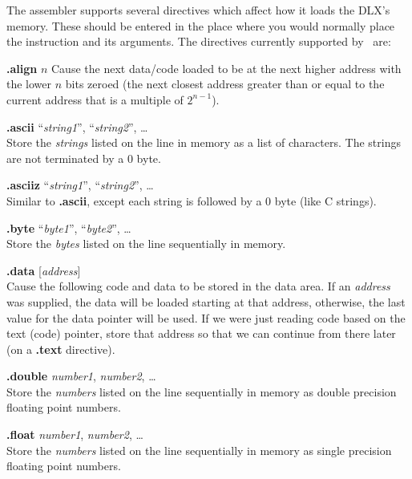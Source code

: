 \begin{mylist}
The assembler supports several directives which affect how it loads
the DLX's memory.  These should be entered in the place where you
would normally place the instruction and its arguments.  The
directives currently supported by \dlxsim\ are:

\begin{mylist}
\item[{\bf .align} $n$ \hfill]
Cause the next data/code loaded to be at the next higher address with
the lower $n$ bits zeroed (the next closest address greater than or
equal to the current address that is a multiple of $2^{n-1}$).

\item[{\bf .ascii} ``{\em string1}'', ``{\em string2}'', \ldots]
\nopagebreak \hfill \\
Store the {\em strings} listed on the line in memory as a list of
characters.  The strings are not terminated by a 0 byte.

\item[{\bf .asciiz} ``{\em string1}'', ``{\em string2}'', \ldots]
\nopagebreak \hfill \\
Similar to {\bf .ascii}, except each string is followed by a 0 byte
(like C strings).

\item[{\bf .byte} ``{\em byte1}'', ``{\em byte2}'', \ldots]
\nopagebreak \hfill \\
Store the {\em bytes} listed on the line sequentially in memory.

\item[{\bf .data} {[}{\em address}{]}]
\nopagebreak \hfill \\
Cause the following code and data to be stored in the data area.  If
an {\em address} was supplied, the data will be loaded starting at
that address, otherwise, the last value for the data pointer will be
used.  If we were just reading code based on the text (code) pointer,
store that address so that we can continue from there later (on a {\bf
.text} directive).

\item[{\bf .double} {\em number1}, {\em number2}, \ldots]
\nopagebreak \hfill \\
Store the {\em numbers} listed on the line sequentially in memory as
double precision floating point numbers.

\item[{\bf .float} {\em number1}, {\em number2}, \ldots]
\nopagebreak \hfill \\
Store the {\em numbers} listed on the line sequentially in memory as
single precision floating point numbers.


\end{mylist}
\end{mylist}
